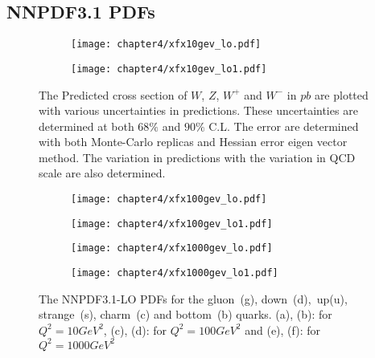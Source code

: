 \documentclass[a4paper,12pt]{report}
\numberwithin{equation}{section}
\begin{document}
\subsection{NNPDF3.1 PDFs}

\begin{figure}[H]
\centering
\begin{subfigure}{0.49\textwidth}
\texttt{[image: chapter4/xfx10gev\_lo.pdf]}
\vspace*{-8mm}
\caption{}
\end{subfigure}
\begin{subfigure}{0.49\textwidth}
\texttt{[image: chapter4/xfx10gev\_lo1.pdf]}
\vspace*{-8mm}
\caption{}
\end{subfigure}The Predicted cross section of $W$, $Z$, $W^{+}$ and $W^{-}$ in $pb$ are plotted with various uncertainties in predictions. These uncertainties are determined at both $68\%$ and $90\%$ C.L. The error are determined with both Monte-Carlo replicas and Hessian error eigen vector method. The variation in predictions with the variation in QCD scale are also determined.\\
\begin{subfigure}{0.49\textwidth}
\texttt{[image: chapter4/xfx100gev\_lo.pdf]}
\vspace*{-8mm}
\caption{}
\end{subfigure}
\begin{subfigure}{0.49\textwidth}
\texttt{[image: chapter4/xfx100gev\_lo1.pdf]}
\vspace*{-8mm}
\caption{}
\end{subfigure}
\begin{subfigure}{0.49\textwidth}
\texttt{[image: chapter4/xfx1000gev\_lo.pdf]}
\vspace*{-8mm}
\caption{}
\end{subfigure}
\begin{subfigure}{0.49\textwidth}
\texttt{[image: chapter4/xfx1000gev\_lo1.pdf]}
\vspace*{-8mm}
\caption{}
\end{subfigure}
\caption{The NNPDF3.1-LO PDFs for the gluon~(g), down~(d),~up(u), strange~(s), charm~(c) and bottom~(b) quarks. (a), (b): for $Q^{2}= 10GeV^{2}$, (c), (d): for $Q^{2}=100GeV^{2}$ and (e), (f): for $Q^{2}=1000GeV^{2}$} 
\end{figure}
\end{document}
